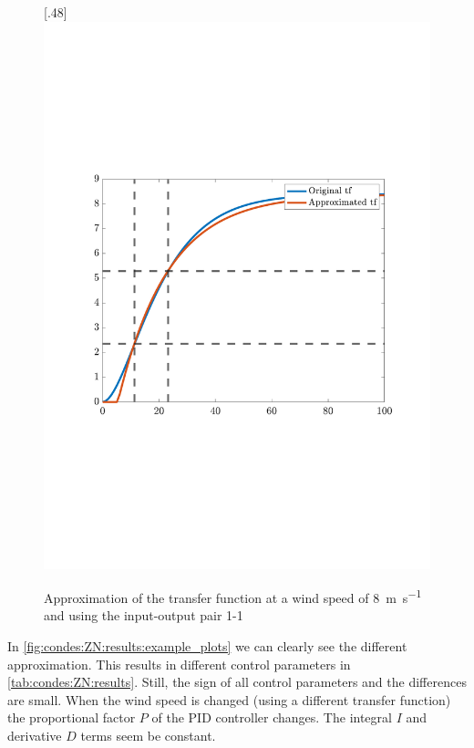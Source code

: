 \begin{figure}[H]
    [.48\textwidth]{\includegraphics[width=1\linewidth, scale=1, trim=75 230 55 120,clip]{fig/G_11_2p_8ms.pdf}}

    \caption{Approximation of the transfer function at a wind speed of \SI{8}{\metre\per\second} and using the input-output pair 1-1}
    \label{fig:condes:ZN:results:example_plots}
\end{figure}

In \autoref{fig:condes:ZN:results:example_plots} we can clearly see the different approximation.
This results in different control parameters in \autoref{tab:condes:ZN:results}.
Still, the sign of all control parameters and the differences are small.
When the wind speed is changed (using a different transfer function) the proportional factor $P$ of the PID controller changes.
The integral $I$ and derivative $D$ terms seem be constant.

